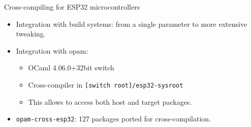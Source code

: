 \documentclass[10pt]{beamer}
\begin{document}
\begin{frame}{Cross-compiling for ESP32 microcontrollers}
\begin{itemize}
\item Integration with build systems: from a single parameter to more extensive tweaking.
\item Integration with opam:
    \begin{itemize}
        \item OCaml 4.06.0+32bit switch
        \item Cross-compiler in \texttt{[switch root]/esp32-sysroot}
        \item This allows to access both host and target packages.
    \end{itemize}
\item \texttt{opam-cross-esp32}: \large{127} \normalsize packages ported for cross-compilation.
\end{itemize}
\end{frame}
\end{document}
